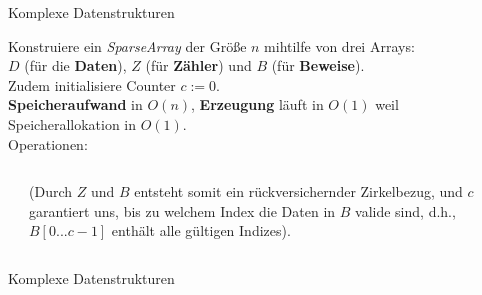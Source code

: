 \begin{frame}{Komplexe Datenstrukturen}
	\solutionheading
	
	Konstruiere ein \emph{SparseArray} der Größe $n$ mihtilfe von drei Arrays: \\ 
	$D$ (für die \textbf{Daten}), $Z$ (für \textbf{Zähler}) und $B$ (für \textbf{Beweise}). \\ 
	Zudem initialisiere Counter $c := 0$. \\ 
	\impl \textbf{Speicheraufwand} in $O(n)$, \textbf{Erzeugung} läuft in $O(1)$ weil Speicherallokation in $O(1)$. \\
	Operationen: \\
	\pause
	\begin{columns}[c]
		\begin{algorithm}[H]
		\end{algorithm}
		\forcenewline
			(Durch $Z$ und $B$ entsteht somit ein rückversichernder Zirkelbezug, und $c$ garantiert uns, bis zu welchem Index die Daten in $B$ valide sind, d.h., $B[0...c-1]$ enthält alle gültigen Indizes).
	\end{columns}
	
	
\end{frame}

\begin{frame}{Komplexe Datenstrukturen}
	\solutionheading
	
	\begin{algorithm}[H]
		\;
		\pause
		\;
	\end{algorithm}
\end{frame}



